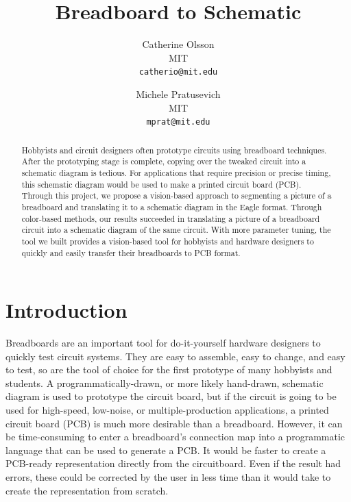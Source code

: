 \documentclass[10pt,twocolumn,letterpaper]{article}
\begin{document}
\title{Breadboard to Schematic}

\author{Catherine Olsson \\
MIT\\
{\tt\small catherio@mit.edu}
\and
Michele Pratusevich\\
MIT\\
{\tt\small mprat@mit.edu}
}

\maketitle
\thispagestyle{empty}

\begin{abstract}

Hobbyists and circuit designers often prototype circuits using breadboard
techniques. After the prototyping stage is complete, copying over the tweaked
circuit into a schematic diagram is tedious. For applications that require
precision or precise timing, this schematic diagram would be used to make a
printed circuit board (PCB). Through this project, we propose a vision-based
approach to segmenting a picture of a breadboard and translating it to a
schematic diagram in the Eagle format. Through color-based methods, our results
succeeded in translating a picture of a breadboard circuit into a schematic
diagram of the same circuit. With more parameter tuning, the tool we built
provides a vision-based tool for hobbyists and hardware designers to quickly
and easily transfer their breadboards to PCB format.    

\end{abstract}

\section{Introduction}

Breadboards are an important tool for do-it-yourself hardware
designers to quickly test circuit systems. They are easy to assemble,
easy to change, and easy to test, so are the tool of choice for the
first prototype of many hobbyists and students. A
programmatically-drawn, or more likely hand-drawn, schematic diagram
is used to prototype the circuit board, but if the circuit is going to
be used for high-speed, low-noise, or multiple-production
applications, a printed circuit board (PCB) is much more desirable
than a breadboard. However, it can be time-consuming to enter a
breadboard's connection map into a programmatic language that can be
used to generate a PCB. It would be faster to create a PCB-ready
representation directly from the circuitboard. Even if the result had
errors, these could be corrected by the user in less time than it
would take to create the representation from scratch.
\end{document}
